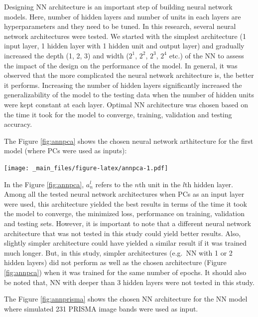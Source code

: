 \documentclass[a4paper, twoside]{templates/ociamthesis}
\let\origfigure\figure
\let\endorigfigure\endfigure
\renewenvironment{figure}[1][2] {
    \expandafter\origfigure\expandafter[H]
} {
    \endorigfigure
}
\begin{document}
Designing NN architecture is an important step of building neural network models. Here, number of hidden layers and number of units in each layers are hyperparameters and they need to be tuned. In this research, several neural network architectures were tested. We started with the simplest architecture (1 input layer, 1 hidden layer with 1 hidden unit and output layer) and gradually increased the depth (1, 2, 3) and width (\(2^{1}\), \(2^{2}\), \(2^{3}\), \(2^{4}\) etc.) of the NN to assess the impact of the design on the performance of the model. In general, it was observed that the more complicated the neural network architecture is, the better it performs. Increasing the number of hidden layers significantly increased the generalizability of the model to the testing data when the number of hidden units were kept constant at each layer. Optimal NN architecture was chosen based on the time it took for the model to converge, training, validation and testing accuracy.

The Figure \ref{fig:annpca} shows the chosen neural network arthitecture for the first model (where PCs were used as inputs):

\begin{figure}
\centering
\texttt{[image: \_main\_files/figure-latex/annpca-1.pdf]}
\caption{\label{fig:annpca}Architecture of the Neural Network with Principal Components as inputs}
\end{figure}

In the Figure \ref{fig:annpca}, \(a_{n}^{l}\) refers to the \(n\)th unit in the \(l\)th hidden layer. Among all the tested neural network architectures when PCs as an input layer were used, this architecture yielded the best results in terms of the time it took the model to converge, the minimized loss, performance on training, validation and testing sets. However, it is important to note that a different neural network architecture that was not tested in this study could yield better results. Also, slightly simpler architecture could have yielded a similar result if it was trained much longer. But, in this study, simpler architectures (e.g.~NN with 1 or 2 hidden layers) did not perform as well as the chosen architecture (Figure \ref{fig:annpca}) when it was trained for the same number of epochs. It should also be noted that, NN with deeper than 3 hidden layers were not tested in this study.

The Figure \ref{fig:annprisma} shows the chosen NN architecture for the NN model where simulated 231 PRISMA image bands were used as input.
\end{document}
